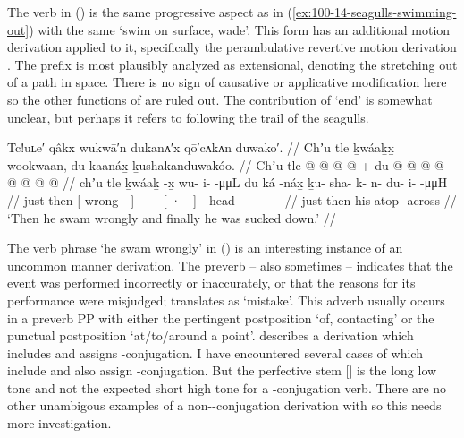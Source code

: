 The verb in (\lastx) is the same progressive aspect as in (\ref{ex:100-14-seagulls-swimming-out}) with the same  ‘swim on surface, wade’.
This form has an additional motion derivation applied to it, specifically the perambulative revertive motion derivation .
The  prefix is most plausibly analyzed as extensional, denoting the stretching out of a path in space.
There is no sign of causative or applicative modification here so the other functions of  are ruled out.
The contribution of  ‘end’ is somewhat unclear, but perhaps it refers to following the trail of the seagulls.

\ex\label{ex:100-16-sucked-under}%
%
\begingl
	\glpreamble	Tc!uʟe′ qâkx wukwā′n dukanᴀ′x qō′cᴀkᴀn duwako′. //
	\glpreamble	Chʼu tle ḵwáaḵx̱ wookwaan, du kaanáx̱ ḵushakanduwakóo. //
	\gla	Chʼu tle {}  @ {} {}  @ {} @ {} @ {} +
			{} du  @ {} {}
			 @ {} @ {} @ {} @ {} @ {} @ {} @ {} //
	\glb	chʼu tle {} ḵwáaḵ -x̱ {} wu- i-  -μμL
			{} du ká -náx̱ {}
			ḵu- sha- k- n- du- i-  -μμH //
	\glc	just then {}[ wrong - {}] - -  -
			{}[ ·  - {}]
			- head- - - - -  - //
	\gld	just then {}  {} {}  {} {} {}
			{} his atop -across {}
			 {} {} {} {} {} {} {} //
	\glft	‘Then he swam wrongly and finally he was sucked down.’
		//
\endgl
\xe

The verb phrase  ‘he swam wrongly’ in (\lastx) is an interesting instance of an uncommon manner derivation.
The  preverb – also sometimes  \parencites[e.g.][220.37]{dauenhauer:1987}[6.108]{nyman:1993} – indicates that the event was performed incorrectly or inaccurately, or that the reasons for its performance were misjudged; \textcite[f01/129]{leer:1973} translates  as ‘mistake’.
This adverb usually occurs in a preverb PP with either the pertingent postposition  ‘of, contacting’ or the punctual postposition  ‘at/to/around a point’.
\textcite[134, 220]{leer:1991} describes a derivation  which includes  and assigns -conjugation.
I have encountered several cases of  which include  and also assign -conjugation.
But the perfective stem  [] is the long low tone  and not the expected short high tone  for a -conjugation verb.
There are no other unambigous examples of a non--conjugation derivation with  so this needs more investigation.

